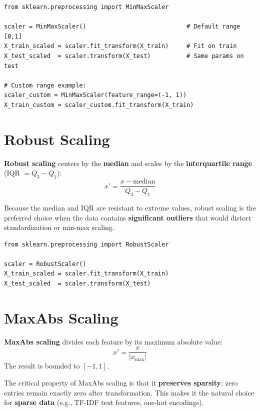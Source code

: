 \begin{lstlisting}[style=pythonstyle]
from sklearn.preprocessing import MinMaxScaler

scaler = MinMaxScaler()                            # Default range [0,1]
X_train_scaled = scaler.fit_transform(X_train)     # Fit on train
X_test_scaled  = scaler.transform(X_test)          # Same params on test

# Custom range example:
scaler_custom = MinMaxScaler(feature_range=(-1, 1))
X_train_custom = scaler_custom.fit_transform(X_train)
\end{lstlisting}

\section*{Robust Scaling}

\begin{definition}
\textbf{Robust scaling} centers by the \textbf{median} and scales by the \textbf{interquartile range} (IQR $= Q_3 - Q_1$):
$$x' = \frac{x - \text{median}}{Q_3 - Q_1}$$
\end{definition}

Because the median and IQR are resistant to extreme values, robust scaling is the preferred choice when the data contains \textbf{significant outliers} that would distort standardization or min-max scaling.

\begin{lstlisting}[style=pythonstyle]
from sklearn.preprocessing import RobustScaler

scaler = RobustScaler()
X_train_scaled = scaler.fit_transform(X_train)
X_test_scaled  = scaler.transform(X_test)
\end{lstlisting}

\section*{MaxAbs Scaling}

\begin{definition}
\textbf{MaxAbs scaling} divides each feature by its maximum absolute value:
$$x' = \frac{x}{|x_{\max}|}$$
The result is bounded to $[-1, 1]$.
\end{definition}

The critical property of MaxAbs scaling is that it \textbf{preserves sparsity}: zero entries remain exactly zero after transformation. This makes it the natural choice for \textbf{sparse data} (e.g., TF-IDF text features, one-hot encodings).

